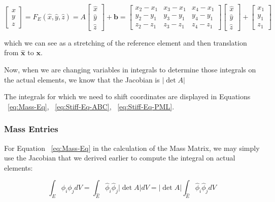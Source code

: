 \begin{equation}
\label{eq:transform}
\begin{bmatrix}
x \\
y \\
z
\end{bmatrix}
= F_E(\hat{x}, \hat{y}, \hat{z}) = A \begin{bmatrix}
\hat{x} \\ 
\hat{y} \\ 
\hat{z}
\end{bmatrix} + \boldsymbol{b}
= \begin{bmatrix}
x_2-x_1 & x_3-x_1 & x_4-x_1 \\
y_2-y_1 & y_3-y_1 & y_4-y_1 \\
z_2-z_1 & z_3-z_1 & z_4-z_1
\end{bmatrix} \begin{bmatrix}
\hat{x} \\
\hat{y} \\
\hat{z}
\end{bmatrix} + \begin{bmatrix}
x_1 \\
y_1 \\
z_1
\end{bmatrix}
\end{equation}

which we can see as a stretching of the reference element and then translation from $\boldsymbol{\hat{x}}$ to $\boldsymbol{x}$.

Now, when we are changing variables in integrals to determine those integrals on the actual elements, we know that the Jacobian is $|\det A|$


The integrals for which we need to shift coordinates are displayed in Equations ~\ref{eq:Mass-Eq}, ~\ref{eq:Stiff-Eq-ABC}, ~\ref{eq:Stiff-Eq-PML}.

\subsubsection{Mass Entries}

For Equation ~\ref{eq:Mass-Eq} in the calculation of the Mass Matrix, we may simply use the Jacobian that we derived earlier to compute the integral on actual elements:

\begin{equation}
\int_E \phi_i \phi_j dV = \int_{\hat{E}} \hat{\phi}_i \hat{\phi}_j |\det A| dV = |\det A| \int_{\hat{E}} \hat{\phi}_i \hat{\phi}_j dV 
\end{equation}


